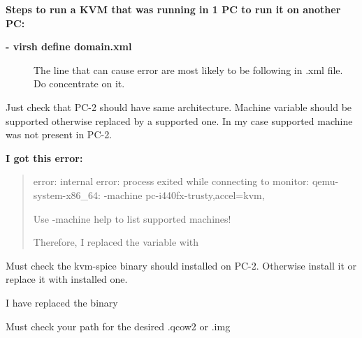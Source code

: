 \documentclass[letterpaper,10pt,english]{sphinxmanual}
\begin{document}
\textbf{Steps to run a KVM that was running in 1 PC to run it on another PC:}
\begin{description}
\item[{\textbf{- virsh define domain.xml}}] \leavevmode
The line that can cause error are most likely to be following in .xml file. Do concentrate on it.
\begin{quote}

\end{quote}

\end{description}

Just check that PC-2 should have same architecture. Machine variable should be supported otherwise replaced by a supported one. In my case supported machine was not present in PC-2.

\textbf{I got this error:}
\begin{quote}

error: internal error: process exited while connecting to monitor: qemu-system-x86\_64: -machine pc-i440fx-trusty,accel=kvm,

Use -machine help to list supported machines!
\begin{description}
\item[{Therefore, I replaced the variable with}] \leavevmode
{}

\end{description}
\end{quote}

Must check the kvm-spice binary should installed on PC-2. Otherwise install it or replace it with installed one.
\begin{description}
\item[{I have replaced the binary}] \leavevmode\begin{quote}

\end{quote}


\end{description}

Must check your path for the desired .qcow2 or .img
\end{document}
